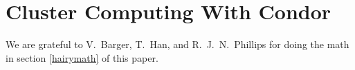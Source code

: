 \documentclass[11pt,twoside]{article}  %
\begin{document}
\section{Cluster Computing With Condor}

\acknowledgments

We are grateful to V.\ Barger, T.\ Han, and R.~J.~N.\ Phillips for doing
the math in section \ref{hairymath} of this paper.

%
%
%
\end{document}
